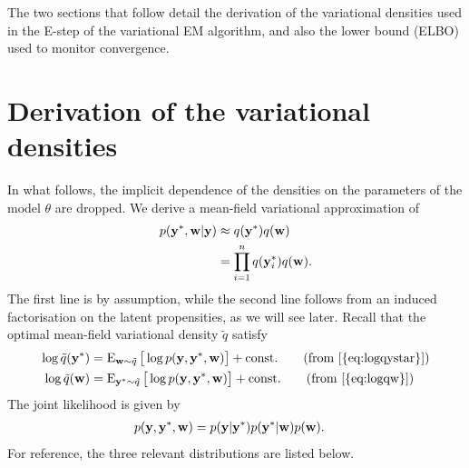 The two sections that follow detail the derivation of the variational densities used in the E-step of the variational EM algorithm, and also the lower bound (ELBO) used to monitor convergence.

\section{Derivation of the variational densities}

In what follows, the implicit dependence of the densities on the parameters of the model $\theta$ are dropped.
We derive a mean-field variational approximation of
\begin{align*}
  p({\mathbf y}^*, {\mathbf w}| {\mathbf y}) 
  &\approx q({\mathbf y}^*)q({\mathbf w}) \\
  &= \prod_{i=1}^n q({\mathbf y}_{i}^*)q({\mathbf w}).
\end{align*}
The first line is by assumption, while the second line follows from an induced factorisation on the latent propensities, as we will see later. 
Recall that the optimal mean-field variational density $\tilde q$ satisfy
\begin{align}
  \log \tilde q(\by^*) &= \E_{\bw\sim\tilde q} \big[ \log p(\by,\by^*,\bw) \big] + \const \tag{from \ref{{eq:logqystar}}} \\
  \log \tilde q(\bw) &= \E_{\by^*\sim\tilde q} \big[ \log p(\by,\by^*,\bw) \big] + \const \tag{from \ref{{eq:logqw}}}
\end{align}
The joint likelihood is given by
\begin{align*}
  p({\mathbf y}, {\mathbf y}^*,{\mathbf w}) 
  &= p({\mathbf y}|{\mathbf y}^*) p({\mathbf y}^* | {\mathbf w}) p({\mathbf w}).
\end{align*}
For reference, the three relevant distributions are listed below.


